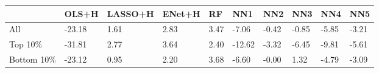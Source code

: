 \begin{tabularx}{\linewidth}{*{9}{X}}
& OLS+H& LASSO+H& ENet+H& RF& NN1& NN2& NN3& NN4& NN5\\
\hline
All& -23.18& 1.61& 2.83& 3.47& -7.06& -0.42& -0.85& -5.85& -3.21\\
\hline
Top 10\%& -31.81& 2.77& 3.64& 2.40& -12.62& -3.32& -6.45& -9.81& -5.61\\
\hline
Bottom 10\%& -23.12& 0.95& 2.20& 3.68& -6.60& -0.00& 1.32& -4.79& -3.09\\
\hline
\end{tabularx}